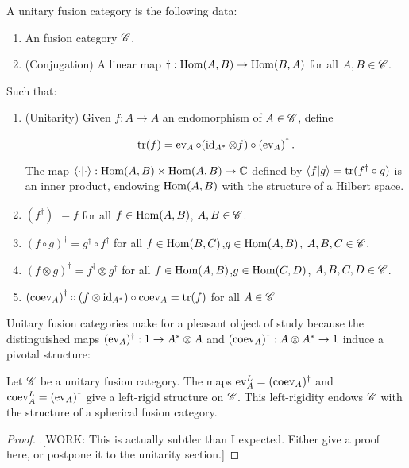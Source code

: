 \begin{definition} A unitary fusion category is the following data:

\begin{enumerate}
\item An fusion category $\mathscr{C}$.
\item (Conjugation) A linear map $\dagger: \operatorname{Hom}(A,B)\to \operatorname{Hom}(B,A)$ for all $A,B\in \mathscr{C}$.
\end{enumerate}

Such that:

\begin{enumerate}
\item (Unitarity) Given $f:A\to A$ an endomorphism of $A\in \mathscr{C}$, define


$$\operatorname{tr}(f)=\operatorname{ev}_A \circ (\operatorname{id}_{A^*}\otimes f)\circ \left(\operatorname{ev}_A\right)^{\dagger}.$$

The map $\left<\cdot|\cdot\right>:\operatorname{Hom}(A,B)\times \operatorname{Hom}(A,B)\to \mathbb{C}$ defined by $\left<f|g\right>=\operatorname{tr}(f^{\dagger}\circ g)$ is an inner product, endowing $\operatorname{Hom}(A,B)$ with the structure of a Hilbert space.
\item $\left(f^{\dagger}\right)^{\dagger}=f$ for all $f\in \operatorname{Hom}(A,B)$, $A,B\in \mathscr{C}$.

\item $(f\circ g)^{\dagger}=g^{\dagger}\circ f^{\dagger}$ for all $f\in \operatorname{Hom}(B,C)$,$g\in \operatorname{Hom}(A,B)$, $A,B,C\in \mathscr{C}$.

\item $(f\otimes g)^{\dagger}=f^{\dagger}\otimes g^{\dagger}$ for all $f\in \operatorname{Hom}(A,B)$,$g\in \operatorname{Hom}(C,D)$, $A,B,C,D\in \mathscr{C}$.
\item $\left(\operatorname{coev}_A\right)^{\dagger}\circ (f \otimes \operatorname{id}_{A^*})\circ \operatorname{coev}_A=\operatorname{tr}(f)$ for all $A\in \mathscr{C}$
\end{enumerate}

\raggedleft\qedsymbol{}
\end{definition}

Unitary fusion categories make for a pleasant object of study because the distinguished maps $(\operatorname{ev}_A)^{\dagger}:1\to A^{*}\otimes A$ and $(\operatorname{coev}_A)^{\dagger}:A\otimes A^{*}\to 1$ induce a pivotal structure:

\begin{proposition} Let $\mathscr{C}$ be a unitary fusion category. The maps $\operatorname{ev}_{A}^L = (\operatorname{coev}_{A})^{\dagger}$ and $\operatorname{coev}^L_{A}=(\operatorname{ev}_A)^{\dagger}$ give a left-rigid structure on $\mathscr{C}$. This left-rigidity endows $\mathscr{C}$ with the structure of a spherical fusion category.
\end{proposition}
\begin{proof}.[WORK: This is actually subtler than I expected. Either give a proof here, or postpone it to the unitarity section.]
\end{proof}

